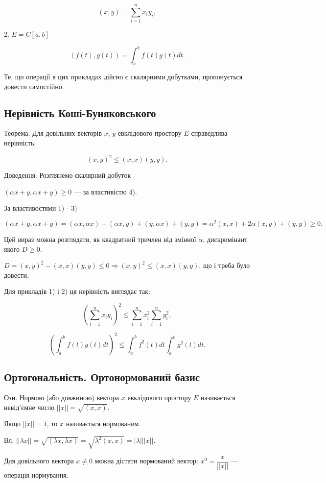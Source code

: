 $$(x,y) = \sum\limits_{i=1}^n x_i y_i,$$

2. $E = C[a,b]$

$$(f(t),g(t)) = \int_a^b f(t) g(t) dt.$$

Те, що операції в цих прикладах дійсно є скалярними добутками,
пропонується довести самостійно.

\subsection*{Нерівність Коші-Буняковського}

Теорема. Для довільних векторів $x$, $y$ евклідового простору $E$
справедлива нерівність: 
 
$$(x,y)^2 \leqslant (x,x)(y,y).$$
 
Доведення: Розглянемо скалярний добуток

$(\alpha x + y, \alpha x + y) \geqslant 0$ --- за властивістю 4).

За властивостями 1) - 3)

$(\alpha x + y, \alpha x + y)
= (\alpha x, \alpha x) + (\alpha x,y) + (y, \alpha x) + (y,y)
= \alpha^2(x,x) + 2\alpha(x,y) + (y,y) \geqslant 0.$

Цей вираз можна розглядати, як квадратний тричлен від змінної $\alpha$,
дискримінант якого $D \geqslant 0$.

$D = (x,y)^2 - (x,x)(y,y) \leqslant 0 \Rightarrow  (x,y)^2 \leqslant (x,x)(y,y)$, що і треба було
довести.


Для прикладів 1) і 2) ця нерівність виглядає так:

$$\left( \sum\limits_{i=1}^n x_i y_i \right)^2  \leqslant \sum\limits_{i=1}^n x_i^2 \sum\limits_{i=1}^n y_i^2,$$

$$\left( \int_a^b f(t) g(t) dt \right)^2 \leqslant \int_a^b f^2(t) dt \int_a^b g^2(t) dt. $$

\subsection*{Ортогональність. Ортонормований базис}

Озн. Нормою (або довжиною) вектора $x$ евклідового простору $E$
називається невід’ємне число $||x|| = \sqrt{(x,x)}$.

Якщо $||x|| = 1$, то $x$ називається нормованим.

Вл. $||\lambda x||
= \sqrt{(\lambda x,\lambda x)}
= \sqrt{\lambda^2(x,x)}
= |\lambda| ||x||$.

Для довільного вектора $x \neq 0$ можна дістати нормований вектор:
$x^0 = \dfrac{x}{||x||}$ --- операція нормування.

